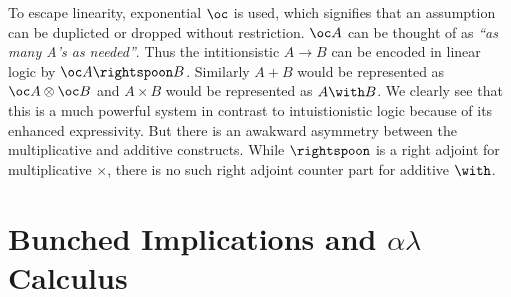To escape linearity, exponential $\oc$ is used, which signifies that an assumption can
be duplicted or dropped without restriction. $\oc A$ can be thought of as {\em``as many A's as needed''}.
Thus the intitionsistic $A \rightarrow B$ can be encoded in linear logic by $\oc A \rightspoon B$.
Similarly $A \plus B$ would be represented as $\oc A \otimes \oc B$ and $A \times B$ would be represented as $A \with B$.
We clearly see that this is a much powerful system in contrast to intuistionistic logic because of its enhanced expressivity.
But there is an awakward asymmetry between the multiplicative and additive constructs. While $\rightspoon$ is a right adjoint
for multiplicative $\times$, there is no such right adjoint counter part for additive $\with$.

\section{Bunched Implications and $\alpha\lambda$ Calculus}

